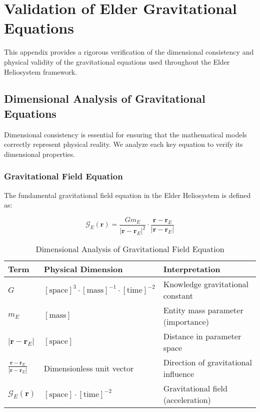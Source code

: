 \chapter{Validation of Elder Gravitational Equations}

This appendix provides a rigorous verification of the dimensional consistency and physical validity of the gravitational equations used throughout the Elder Heliosystem framework.

\section{Dimensional Analysis of Gravitational Equations}

Dimensional consistency is essential for ensuring that the mathematical models correctly represent physical reality. We analyze each key equation to verify its dimensional properties.

\subsection{Gravitational Field Equation}

The fundamental gravitational field equation in the Elder Heliosystem is defined as:

\begin{equation}
\mathcal{G}_E(\mathbf{r}) = \frac{G m_E}{|\mathbf{r} - \mathbf{r}_E|^2} \cdot \frac{\mathbf{r} - \mathbf{r}_E}{|\mathbf{r} - \mathbf{r}_E|}
\end{equation}

\begin{table}[h]
\centering
\caption{Dimensional Analysis of Gravitational Field Equation}
\label{tab:dimensional_analysis_grav_field}
\begin{tabular}{p{3cm} p{5cm} p{6cm}}
\textbf{Term} & \textbf{Physical Dimension} & \textbf{Interpretation} \\
\hline
$G$ & $[\text{space}]^3 \cdot [\text{mass}]^{-1} \cdot [\text{time}]^{-2}$ & Knowledge gravitational constant \\
$m_E$ & $[\text{mass}]$ & Entity mass parameter (importance) \\
$|\mathbf{r} - \mathbf{r}_E|$ & $[\text{space}]$ & Distance in parameter space \\
$\frac{\mathbf{r} - \mathbf{r}_E}{|\mathbf{r} - \mathbf{r}_E|}$ & Dimensionless unit vector & Direction of gravitational influence \\
\hline
$\mathcal{G}_E(\mathbf{r})$ & $[\text{space}] \cdot [\text{time}]^{-2}$ & Gravitational field (acceleration) \\
\hline
\end{tabular}
\end{table}

